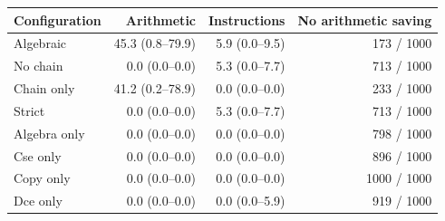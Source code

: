 \begin{tabular}{@{}lrrr@{}}
\toprule
Configuration & Arithmetic & Instructions & No arithmetic saving \\
\midrule
Algebraic & 45.3 (0.8--79.9) & 5.9 (0.0--9.5) & 173 / 1000 \\
No chain & 0.0 (0.0--0.0) & 5.3 (0.0--7.7) & 713 / 1000 \\
Chain only & 41.2 (0.2--78.9) & 0.0 (0.0--0.0) & 233 / 1000 \\
Strict & 0.0 (0.0--0.0) & 5.3 (0.0--7.7) & 713 / 1000 \\
Algebra only & 0.0 (0.0--0.0) & 0.0 (0.0--0.0) & 798 / 1000 \\
Cse only & 0.0 (0.0--0.0) & 0.0 (0.0--0.0) & 896 / 1000 \\
Copy only & 0.0 (0.0--0.0) & 0.0 (0.0--0.0) & 1000 / 1000 \\
Dce only & 0.0 (0.0--0.0) & 0.0 (0.0--5.9) & 919 / 1000 \\
\bottomrule
\end{tabular}

